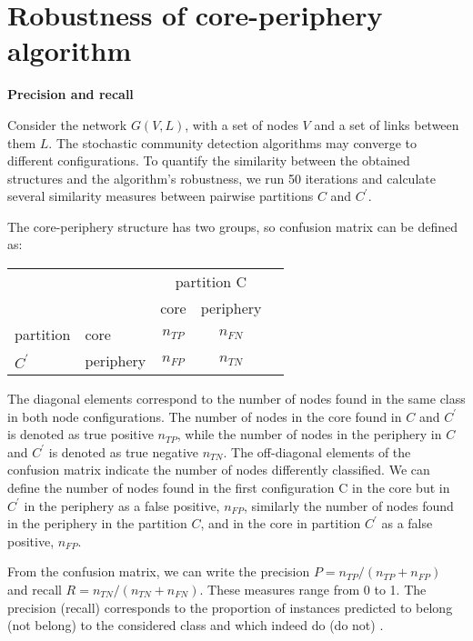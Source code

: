 \chapter{Robustness of core-periphery algorithm} %
\label{App:robust}
\textbf{Precision and recall}

Consider the network $G(V, L)$, with a set of nodes $V$ and a set of links between them $L$. The stochastic community detection algorithms may converge to different configurations. To quantify the similarity between the obtained structures and the algorithm's robustness, we run 50 iterations and calculate several similarity measures between pairwise partitions $C$ and $C^{'}$.

The core-periphery structure has two groups, so confusion matrix \cite{labatut2012accuracy} can be defined as:

\begin{center}
	
	\begin{tabular}{l|l|c|c|c} 
		
		\multicolumn{2}{c}{}&\multicolumn{2}{c}{partition C}&\\ 
		
		\cline{3-4} 
		\multicolumn{2}{c|}{}&core&periphery&\multicolumn{1}{c}{}\\
		\cline{2-4} 
		partition & core & $n_{TP}$ & $n_{FN}$ & \\ 
		\cline{2-4} $C^{'}$ & periphery & $n_{FP}$ & $n_{TN}$ & \\ 
		\cline{2-4}
	\end{tabular}
\end{center}

The diagonal elements correspond to the number of nodes found in the same class in both node configurations. The number of nodes in the core found in $C$ and $C^{'}$ is denoted as true positive $n_{TP}$, while the number of nodes in the periphery in $C$ and $C^{'}$ is denoted as true negative $n_{TN}$. The off-diagonal elements of the confusion matrix indicate the number of nodes differently classified. We can define the number of nodes found in the first configuration C in the core but in $C^{'}$ in the periphery as a false positive, $n_{FP}$, similarly the number of nodes found in the periphery in the partition $C$, and in the core in partition $C^{'}$ as a false positive, $n_{FP}$. 

From the confusion matrix, we can write the precision $P =n_{TP}/(n_{TP}+n_{FP})$ and recall $R=n_{TN}/(n_{TN}+n_{FN})$. These measures range from 0 to 1. The precision (recall) corresponds to the proportion of instances predicted to belong (not belong) to the considered class and which indeed do (do not) \cite{labatut2012accuracy}.

